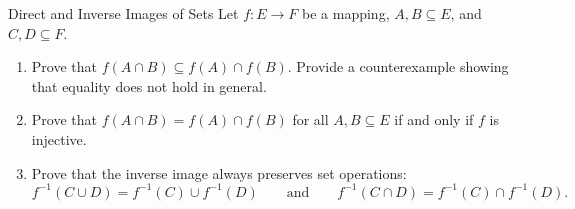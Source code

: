 \begin{exercise}{Direct and Inverse Images of Sets}
Let $f: E \to F$ be a mapping, $A, B \subseteq E$, and $C, D \subseteq F$.
\begin{enumerate}[leftmargin=1.5em,itemsep=2pt]
  \item Prove that $f(A \cap B) \subseteq f(A) \cap f(B)$. Provide a counterexample showing that equality does not hold in general.
  \item Prove that $f(A \cap B) = f(A) \cap f(B)$ for all $A, B \subseteq E$ if and only if $f$ is injective.
  \item Prove that the inverse image always preserves set operations:
  \[
  f^{-1}(C \cup D) = f^{-1}(C) \cup f^{-1}(D) \qquad \text{and} \qquad f^{-1}(C \cap D) = f^{-1}(C) \cap f^{-1}(D).
  \]
\end{enumerate}
\end{exercise}

\begin{tabletworkspace}[5.0cm]
\end{tabletworkspace}


